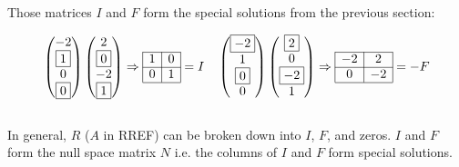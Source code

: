 \documentclass[12pt]{article}
\begin{document}
Those matrices $I$ and $F$ form the special solutions from the previous section:

\[
\left(
    \begin{matrix}
        -2\\
        \boxed{1}\\
        0\\
        \boxed{0}\\
    \end{matrix}
\right)
\left(
    \begin{matrix}
        2\\
        \boxed{0}\\
        -2\\
        \boxed{1}\\
    \end{matrix}
\right)
\Rightarrow
    \begin{array}{*{2}{c}}
    \cline{1-2}
    \multicolumn{1}{|c|}{1} & \multicolumn{1}{c|}{0}\\
    \cline{1-2}
    \multicolumn{1}{|c|}{0} & \multicolumn{1}{c|}{1}\\
    \cline{1-2}
    \end{array}
=I
\quad
\left(
    \begin{matrix}
        \boxed{-2}\\
        1\\
        \boxed{0}\\
        0\\
    \end{matrix}
\right)
\left(
    \begin{matrix}
        \boxed{2}\\
        0\\
        \boxed{-2}\\
        1\\
    \end{matrix}
\right)
\Rightarrow
    \begin{array}{*{2}{c}}
    \cline{1-2}
    \multicolumn{1}{|c|}{-2} & \multicolumn{1}{c|}{2}\\
    \cline{1-2}
    \multicolumn{1}{|c|}{0} & \multicolumn{1}{c|}{-2}\\
    \cline{1-2}
    \end{array}
=-F
\]

$\>$

In general, $R$ ($A$ in RREF) can be broken down into $I$, $F$, and zeros. $I$ and $F$ form the null space matrix $N$ i.e. the columns of $I$ and $F$ form special solutions.
\end{document}
